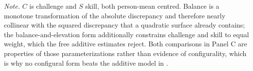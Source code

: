 \begin{table}[!htbp]
\begin{tabular*}{\textwidth}{@{\extracolsep{\fill}}lcccc@{}}
\bottomrule
\end{tabular*}
\par\vspace{3pt}\noindent\parbox{\textwidth}{\footnotesize\textit{Note.} $C$ is challenge and $S$ skill, both person-mean centred. Balance is a monotone transformation of the absolute discrepancy and therefore nearly collinear with the squared discrepancy that a quadratic surface already contains; the balance-and-elevation form additionally constrains challenge and skill to equal weight, which the free additive estimates reject. Both comparisons in Panel C are properties of those parameterizations rather than evidence of configurality, which is why no configural form beats the additive model in .}
\endgroup
\end{table}
